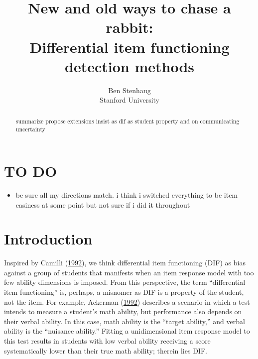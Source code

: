 \documentclass[
  11pt,
]{article}
\title{New and old ways to chase a rabbit:\\
Differential item functioning detection methods}
\subtitle{Ben Stenhaug\\
Stanford University}
\author{}
\date{\vspace{-2.5em}}
\providecommand{\tightlist}{%
  \setlength{\itemsep}{0pt}\setlength{\parskip}{0pt}}
\begin{document}
\maketitle
\begin{abstract}
summarize propose extensions insist as dif as student property and on communicating uncertainty
\end{abstract}

{
\setcounter{tocdepth}{5}
\tableofcontents
}
\clearpage

\hypertarget{to-do}{%
\section{TO DO}\label{to-do}}

\begin{itemize}
\tightlist
\item
  be sure all my directions match. i think i switched everything to be item easiness at some point but not sure if i did it throughout
\end{itemize}

\hypertarget{introduction}{%
\section{Introduction}\label{introduction}}

Inspired by Camilli (\protect\hyperlink{ref-camilli1992conceptual}{1992}), we think differential item functioning (DIF) as bias against a group of students that manifests when an item response model with too few ability dimensions is imposed. From this perspective, the term \enquote{differential item functioning} is, perhaps, a misnomer as DIF is a property of the student, not the item. For example, Ackerman (\protect\hyperlink{ref-ackerman1992didactic}{1992}) describes a scenario in which a test intends to measure a student's math ability, but performance also depends on their verbal ability. In this case, math ability is the \enquote{target ability,} and verbal ability is the \enquote{nuisance ability.} Fitting a unidimensional item response model to this test results in students with low verbal ability receiving a score systematically lower than their true math ability; therein lies DIF.
\end{document}
